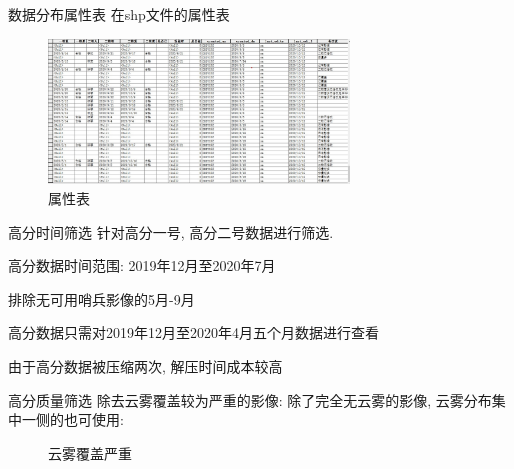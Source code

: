 \begin{frame}{数据分布属性表}
    在shp文件的属性表
    \begin{figure}
        \centering
        \includegraphics[width=8cm]{pic/pic0111.jpg}
        \caption{属性表}
        \label{fig:0107}
    \end{figure}
\end{frame}

\begin{frame}{高分时间筛选}
    针对高分一号, 高分二号数据进行筛选. 
    
    高分数据时间范围: 2019年12月至2020年7月
    
    排除无可用哨兵影像的5月-9月

    高分数据只需对2019年12月至2020年4月五个月数据进行查看

    由于高分数据被压缩两次, 解压时间成本较高

\end{frame}

\begin{frame}{高分质量筛选}
    除去云雾覆盖较为严重的影像:
    \small{除了完全无云雾的影像, 云雾分布集中一侧的也可使用}:
    \begin{figure}[!htbp]
        \centering
        \quad
        \caption{云雾覆盖严重}
        \label{fig:0108}
    \end{figure}
\end{frame}

